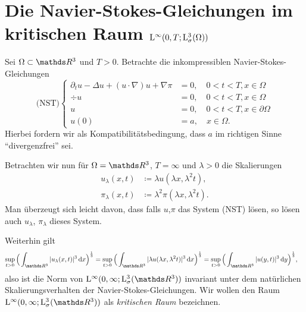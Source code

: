 \chapter{Die Navier-Stokes-Gleichungen im kritischen Raum $\mathrm{L}^\infty(0,T; \mathrm{L}^3_\sigma(\Omega))$}

Sei $\Omega \subset \R^3$ und $T > 0$.
Betrachte die inkompressiblen Navier-Stokes-Gleichungen
$$
\text{(NST)} \begin{cases}
  \partial_t u - \Delta u + (u \cdot \nabla) u + \nabla \pi &= 0, \quad 0 < t < T, x \in \Omega \\
  \div u &= 0, \quad 0 < t < T, x \in \Omega \\
  u &= 0, \quad 0 < t < T, x \in \partial\Omega \\
  u(0) &= a, \quad x \in \Omega.
\end{cases}
$$
Hierbei fordern wir als Kompatibilitätsbedingung, dass $a$ im richtigen Sinne ``divergenzfrei'' sei.

Betrachten wir nun für $\Omega = \R^3$, $T = \infty$ und $\lambda > 0$ die Skalierungen
\begin{align*}
  u_\lambda(x,t)  &\coloneqq \lambda u(\lambda x, \lambda^2 t), \\
  \pi_\lambda(x,t) &\coloneqq \lambda^2 \pi(\lambda x, \lambda^2 t).
\end{align*}
Man überzeugt sich leicht davon, dass falls $u$,$\pi$ das System (NST) lösen, so lösen auch $u_\lambda$, $\pi_\lambda$ dieses System.

Weiterhin gilt
\begin{align*}
  \sup_{t > 0} \Big( \int_{\R^3} |u_\lambda(x,t)|^3 \d x \Big)^{\frac{1}{3}} 
  &= \sup_{t > 0} \Big( \int_{\R^3} |\lambda u (\lambda x, \lambda^2 t) |^3 \d x \Big)^{\frac{1}{3}} 
  = \sup_{t > 0} \Big( \int_{\R^3} |u(y,t)|^3 \d y \Big)^{\frac{1}{3}},
  \end{align*}
also ist die Norm von $\Ell^\infty(0,\infty; \Ell_\sigma^3(\R^3))$ invariant unter dem natürlichen Skalierungsverhalten der Navier-Stokes-Gleichungen.
Wir wollen den Raum $\Ell^\infty(0,\infty; \Ell^3_\sigma(\R^3))$ als \emph{kritischen Raum} bezeichnen.

